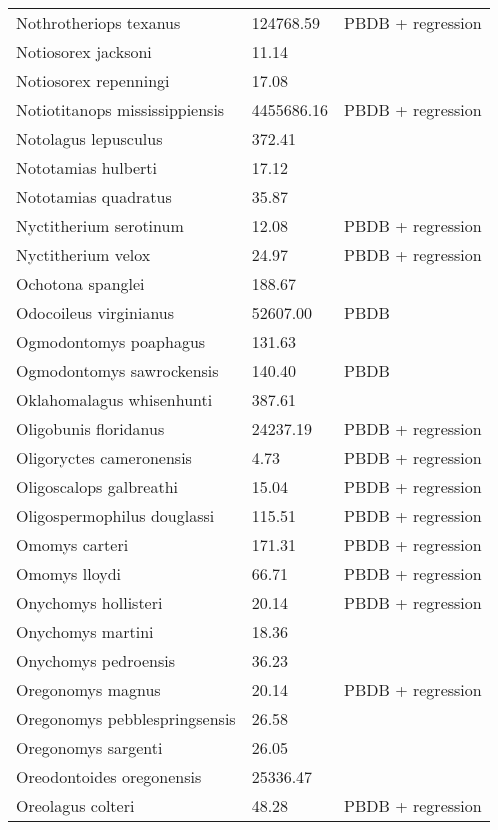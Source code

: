 \begin{center}
\begin{longtable}{p{} p{} p{} }
  Nothrotheriops texanus & 124768.59 & PBDB + regression \\ 
  Notiosorex jacksoni & 11.14 & \cite{Madden1985} \\ 
  Notiosorex repenningi & 17.08 & \cite{Lillegraven1977} \\ 
  Notiotitanops mississippiensis & 4455686.16 & PBDB + regression \\ 
  Notolagus lepusculus & 372.41 & \cite{Tomiya2013} \\ 
  Nototamias hulberti & 17.12 & \cite{Tomiya2013} \\ 
  Nototamias quadratus & 35.87 & \cite{Tomiya2013} \\ 
  Nyctitherium serotinum & 12.08 & PBDB + regression \\ 
  Nyctitherium velox & 24.97 & PBDB + regression \\ 
  Ochotona spanglei & 188.67 & \cite{Tomiya2013} \\ 
  Odocoileus virginianus & 52607.00 & PBDB \\ 
  Ogmodontomys poaphagus & 131.63 & \cite{Tomiya2013} \\ 
  Ogmodontomys sawrockensis & 140.40 & PBDB \\ 
  Oklahomalagus whisenhunti & 387.61 & \cite{Tomiya2013} \\ 
  Oligobunis floridanus & 24237.19 & PBDB + regression \\ 
  Oligoryctes cameronensis & 4.73 & PBDB + regression \\ 
  Oligoscalops galbreathi & 15.04 & PBDB + regression \\ 
  Oligospermophilus douglassi & 115.51 & PBDB + regression \\ 
  Omomys carteri & 171.31 & PBDB + regression \\ 
  Omomys lloydi & 66.71 & PBDB + regression \\ 
  Onychomys hollisteri & 20.14 & PBDB + regression \\ 
  Onychomys martini & 18.36 & \cite{Tomiya2013} \\ 
  Onychomys pedroensis & 36.23 & \cite{Tomiya2013} \\ 
  Oregonomys magnus & 20.14 & PBDB + regression \\ 
  Oregonomys pebblespringsensis & 26.58 & \cite{Tomiya2013} \\ 
  Oregonomys sargenti & 26.05 & \cite{Tomiya2013} \\ 
  Oreodontoides oregonensis & 25336.47 & \cite{Tomiya2013} \\ 
  Oreolagus colteri & 48.28 & PBDB + regression \\ 

\end{longtable}
\end{center}
